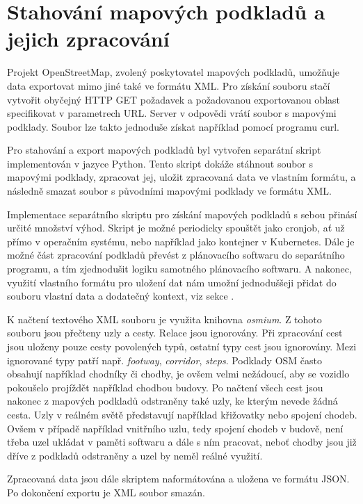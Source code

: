 \documentclass[czech, bachelor]{diploma}
\begin{document}
\section{Stahování mapových podkladů a jejich zpracování}

Projekt OpenStreetMap, zvolený poskytovatel mapových podkladů, umožňuje data exportovat mimo jiné také ve formátu XML. Pro získání
souboru stačí vytvořit obyčejný HTTP GET požadavek a požadovanou exportovanou oblast specifikovat v parametrech URL. Server
v odpovědi vrátí soubor s mapovými podklady. Soubor lze takto jednoduše získat například pomocí programu curl.

Pro stahování a export mapových podkladů byl vytvořen separátní skript implementován v jazyce Python. Tento skript dokáže stáhnout
soubor s mapovými podklady, zpracovat jej, uložit zpracovaná data ve vlastním formátu, a následně smazat soubor s původními
mapovými podklady ve formátu XML.

Implementace separátního skriptu pro získání mapových podkladů s sebou přinásí určité množství výhod. Skript je možné periodicky
spouštět jako cronjob, ať už přímo v operačním systému, nebo například jako kontejner v Kubernetes. Dále je možné část zpracování
podkladů převést z plánovacího softwaru do separátního programu, a tím zjednodušit logiku samotného plánovacího softwaru.
A nakonec, využití vlastního formátu pro uložení dat nám umožní jednoduššeji přidat do souboru vlastní data a dodatečný kontext,
viz sekce .

K načtení textového XML souboru je využita knihovna \emph{osmium}. Z tohoto souboru jsou přečteny uzly a cesty. Relace jsou
ignorovány. Při zpracování cest jsou uloženy pouze cesty povolených typů, ostatní typy cest jsou ignorovány. Mezi ignorované typy
patří např. \emph{footway}, \emph{corridor}, \emph{steps}. Podklady OSM často obsahují například chodníky či chodby, je ovšem
velmi nežádoucí, aby se vozidlo pokoušelo projíždět například chodbou budovy. Po načtení všech cest jsou nakonec z mapových
podkladů odstraněny také uzly, ke kterým nevede žádná cesta. Uzly v reálném světě představují například křižovatky nebo spojení
chodeb. Ovšem v případě například vnitřního uzlu, tedy spojení chodeb v budově, není třeba uzel ukládat v paměti softwaru a dále
s ním pracovat, neboť chodby jsou již dříve z podkladů odstraněny a uzel by neměl reálné využití.

Zpracovaná data jsou dále skriptem naformátována a uložena ve formátu JSON. Po dokončení exportu je XML soubor smazán.
\end{document}
